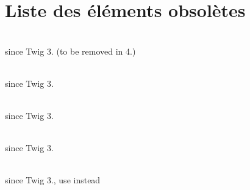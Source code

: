 \chapter{Liste des éléments obsolètes }
\hypertarget{deprecated}{}\label{deprecated}

\begin{DoxyRefList}
\item[{\parbox[t]{\linewidth}{Class \doxylink{class_twig_1_1_node_visitor_1_1_abstract_node_visitor}{Abstract\+Node\+Visitor} }}]\hfill \\
\label{deprecated__deprecated000034}%
%
since Twig 3. (to be removed in 4.)  
\item[{\parbox[t]{\linewidth}{Global(e) \doxylink{class_twig_1_1_abstract_twig_callable_aaa68d6b85ed3f3f66c20ebeacb96496d}{Abstract\+Twig\+Callable::\+get\+Alternative} ()}}]\hfill \\
\label{deprecated__deprecated000005}%
%
since Twig 3.  
\item[{\parbox[t]{\linewidth}{Global(e) \doxylink{class_twig_1_1_abstract_twig_callable_a2ba6a5f35ed4a08151f080a32943c2d0}{Abstract\+Twig\+Callable::\+get\+Deprecated\+Version} ()}}]\hfill \\
\label{deprecated__deprecated000004}%
%
since Twig 3.  
\item[{\parbox[t]{\linewidth}{Global(e) \doxylink{class_twig_1_1_abstract_twig_callable_a0f3e7938b0a479ef4c844022ce1616df}{Abstract\+Twig\+Callable::\+get\+Deprecating\+Package} ()}}]\hfill \\
\label{deprecated__deprecated000003}%
%
since Twig 3.  
\item[{\parbox[t]{\linewidth}{Global(e) \doxylink{class_twig_1_1_abstract_twig_callable_a54df7b21fe0700333277b9404774f333}{Abstract\+Twig\+Callable::\+set\+Arguments} (array \$arguments)}}]\hfill \\
\label{deprecated__deprecated000002}%
%
since Twig 3., use  instead  
\item[{\parbox[t]{\linewidth}{Global(e) \doxylink{class_twig_1_1_node_1_1_expression_1_1_call_expression_a3546f967ad32236268c7e2ef810b707a}{Call\+Expression::\+get\+Arguments} (\$callable, \$arguments)}}]\hfill \\

\end{DoxyRefList}
